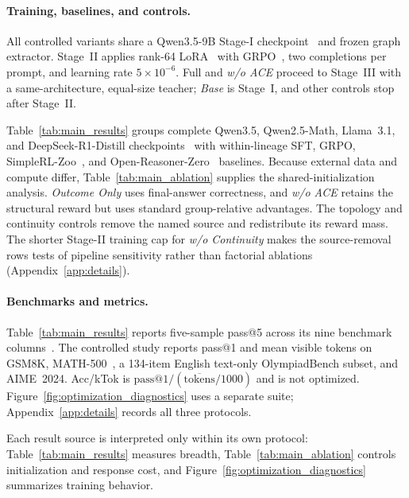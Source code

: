 \paragraph{Training, baselines, and controls.}
All controlled variants share a Qwen3.5-9B Stage-I checkpoint~\citep{qwen35team2026} and frozen graph extractor. Stage~II applies rank-64 LoRA~\citep{hu2022lora} with GRPO~\citep{shao2024deepseekmath}, two completions per prompt, and learning rate $5\times10^{-6}$. Full and \emph{w/o ACE} proceed to Stage~III with a same-architecture, equal-size teacher; \emph{Base} is Stage~I, and other controls stop after Stage~II.

Table~\ref{tab:main_results} groups complete Qwen3.5, Qwen2.5-Math, Llama~3.1, and DeepSeek-R1-Distill checkpoints~\citep{qwen35team2026_2b,qwen35team2026_4b,yang2024qwen2,grattafiori2024llama,deepseekr1} with within-lineage SFT, GRPO, SimpleRL-Zoo~\citep{zeng2025simplerlzoo}, and Open-Reasoner-Zero~\citep{hu2026open} baselines. Because external data and compute differ, Table~\ref{tab:main_ablation} supplies the shared-initialization analysis. \emph{Outcome Only} uses final-answer correctness, and \emph{w/o ACE} retains the structural reward but uses standard group-relative advantages. The topology and continuity controls remove the named source and redistribute its reward mass. The shorter Stage-II training cap for \emph{w/o Continuity} makes the source-removal rows tests of pipeline sensitivity rather than factorial ablations (Appendix~\ref{app:details}).

\paragraph{Benchmarks and metrics.}
Table~\ref{tab:main_results} reports five-sample pass@5 across its nine benchmark columns~\citep{cobbe2021gsm8k,hendrycks2021math,he2024olympiadbench,gao2024omnimath,hendrycks2020mmlu,rein2023gpqa}. The controlled study reports pass@1 and mean visible tokens on GSM8K, MATH-500~\citep{lightman2023lets}, a 134-item English text-only OlympiadBench subset, and AIME~2024. Acc/kTok is $\mathrm{pass@1}/(\overline{\mathrm{tokens}}/1000)$ and is not optimized. Figure~\ref{fig:optimization_diagnostics} uses a separate suite; Appendix~\ref{app:details} records all three protocols.

Each result source is interpreted only within its own protocol: Table~\ref{tab:main_results} measures breadth, Table~\ref{tab:main_ablation} controls initialization and response cost, and Figure~\ref{fig:optimization_diagnostics} summarizes training behavior.

